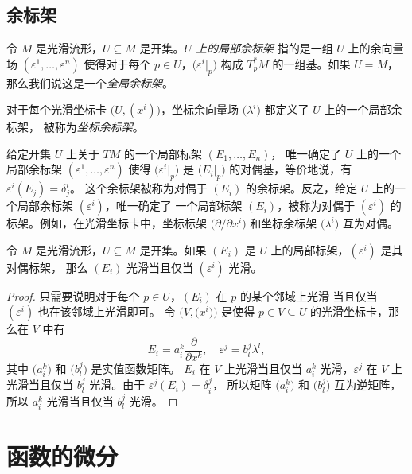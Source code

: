 \subsection{余标架}

令 $M$ 是光滑流形，$U\subseteq M$ 是开集。\emph{$U$ 上的局部余标架}
指的是一组 $U$ 上的余向量场 $(\varepsilon^1,\dots,\varepsilon^n)$
使得对于每个 $p\in U$，$\bigl(\varepsilon^i|_p\bigr)$ 构成
$T_p^*M$ 的一组基。如果 $U=M$，那么我们说这是一个\emph{全局余标架}。

\begin{example}[坐标余标架]
  对于每个光滑坐标卡 $\bigl(U,(x^i)\bigr)$，坐标余向量场
  $\bigl(\lambda^i\bigr)$ 都定义了 $U$ 上的一个局部余标架，
  被称为\emph{坐标余标架}。
\end{example}

给定开集 $U$ 上关于 $TM$ 的一个局部标架 $(E_1,\dots,E_n)$，
唯一确定了 $U$ 上的一个局部余标架 $(\varepsilon^1,\dots,\varepsilon^n)$
使得 $\bigl(\varepsilon^i|_p\bigr)$ 是 $\bigl(E_i|_p\bigr)$
的对偶基，等价地说，有 $\varepsilon^i(E_j)=\delta_j^i$。
这个余标架被称为对偶于 $(E_i)$ 的余标架。反之，给定
$U$ 上的一个局部余标架 $(\varepsilon^i)$，唯一确定了
一个局部标架 $(E_i)$，被称为对偶于 $(\varepsilon^i)$
的标架。例如，在光滑坐标卡中，坐标标架 $\bigl(\partial/\partial x^i\bigr)$
和坐标余标架 $\bigl(\lambda^i\bigr)$ 互为对偶。

\begin{lemma}
  令 $M$ 是光滑流形，$U\subseteq M$ 是开集。如果 $(E_i)$
  是 $U$ 上的局部标架，$(\varepsilon^i)$ 是其对偶标架，
  那么 $(E_i)$ 光滑当且仅当 $(\varepsilon^i)$ 光滑。
\end{lemma}
\begin{proof}
  只需要说明对于每个 $p\in U$，$(E_i)$ 在 $p$ 的某个邻域上光滑
  当且仅当 $(\varepsilon^i)$ 也在该邻域上光滑即可。
  令 $\bigl(V,\bigl(x^i\bigr)\bigr)$ 是使得 $p\in V\subseteq U$
  的光滑坐标卡，那么在 $V$ 中有
  \[
    E_i=a_i^k\frac{\partial}{\partial x^k},\quad
    \varepsilon^j=b_l^j\lambda^l,
  \]
  其中 $\bigl(a_i^k\bigr)$ 和 $\bigl(b_l^j\bigr)$ 是实值函数矩阵。
  $E_i$ 在 $V$ 上光滑当且仅当 $a_i^k$ 光滑，$\varepsilon^j$ 
  在 $V$ 上光滑当且仅当 $b_l^j$ 光滑。由于 $\varepsilon^j(E_i)=\delta_i^j$，
  所以矩阵 $\bigl(a_i^k\bigr)$ 和 $\bigl(b_l^j\bigr)$ 互为逆矩阵，
  所以 $a_i^k$ 光滑当且仅当 $b_l^j$ 光滑。
\end{proof}





\section{函数的微分}


